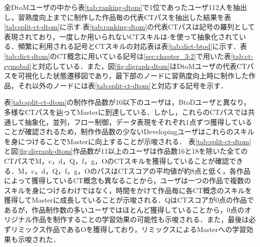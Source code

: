 \documentclass[11pt,dvipdfmx]{jreport}
\begin{document}
全DtoMユーザの中から表\ref{tab:ranking-dtom}で1位であったユーザ112人を抽出し，習熟度向上までに制作した作品毎の代表CTパスを抽出した結果を表\ref{tab:split-ct-dtom}に示す.表\ref{tab:ranking-dtom}の代表CTパスは記号の羅列として表現されており，一度しか用いられないCTスキルは-を使って抽象化されている．頻繁に利用される記号とCTスキルの対応表は表\ref{tab:dict-btod}に示す．表\ref{tab:dict-dtom}のCT概念に用いている記号は\ref{sec:chapter_3-2}で用いた表\ref{tab:ct-symobol}と対応している．また，図\ref{fig:digraph-dtom}はDtoMユーザの代表CTパスを可視化した状態遷移図であり，最下部のノードに習熟度向上時に制作した作品，それ以外のノードには表\ref{tab:split-ct-dtom}と対応する記号を示す．

表\ref{tab:split-ct-dtom}の制作作品数が10以下のユーザは，BtoDユーザと異なり，多様なCTパスを辿ってMasterに到達している．しかし，これらのCTパスでは共通して抽象化，並列，フロー制御，データ表現をそれぞれ1点ずつ獲得していることが確認されるため，制作作品数の少ないDevelopingユーザはこれらのスキルを身につけることでMasterに向上することが示唆される．
表\ref{tab:split-ct-dtom}と図\ref{fig:digraph-dtom}作品数が11以上のユーザは作品数16と18を除いた全てのCTパスでM，c，d，Q，f，g，OのCTスキルを獲得していることが確認できる．M，c，d，Q，f，g，OのパスはCTスコアの平均値が約8点と低く，各作品によって獲得しているCT概念も異なることから，ユーザは一つの作品で複数のスキルを身につけるわけではなく，時間をかけて作品毎に各CT概念のスキルを獲得してMasterに成長していることが示唆される．QはCTスコアが0点の作品であるが，作品制作数の多いユーザではほとんど獲得していることから，0点のオリジナル作品を制作することの学習効果の可能性も示唆される．また，最後は必ずリミックス作品であるOを獲得しており，リミックスによるMasterへの学習効果も示唆された．
\end{document}
